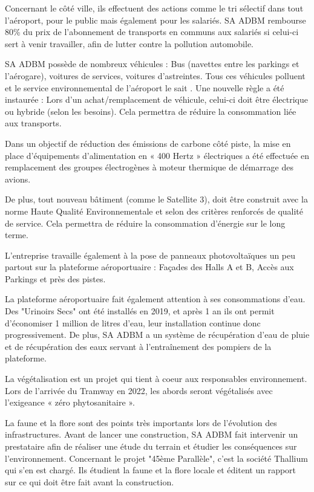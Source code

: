 Concernant le côté ville, ils effectuent des actions comme le tri sélectif dans tout l'aéroport, pour le public mais également pour les salariés. SA ADBM rembourse 80\% du prix de l'abonnement de transports en communs aux salariés si celui-ci sert à venir travailler, afin de lutter contre la pollution automobile.


SA ADBM possède de nombreux véhicules : Bus (navettes entre les parkings et l'aérogare), voitures de services, voitures d'astreintes. Tous ces véhicules polluent et le service environnemental de l'aéroport le sait . Une nouvelle règle a été instaurée : Lors d'un achat/remplacement de véhicule, celui-ci doit être électrique ou hybride (selon les besoins). Cela permettra de réduire la consommation liée aux transports.\newline


Dans un objectif de réduction des émissions de carbone côté piste, la mise en place d’équipements d’alimentation en « 400 Hertz » électriques a été effectuée en remplacement des groupes électrogènes à moteur thermique de démarrage des avions.


De plus, tout nouveau bâtiment (comme le Satellite 3), doit être construit avec la norme Haute Qualité Environnementale et selon des critères renforcés de qualité de service. Cela permettra de réduire la consommation d'énergie sur le long terme.\newline


L'entreprise travaille également à la pose de panneaux photovoltaïques un peu partout sur la plateforme aéroportuaire : Façades des Halls A et B, Accès aux Parkings et près des pistes.


La plateforme aéroportuaire fait également attention à ses consommations d'eau. Des "Urinoirs Secs" ont été installés en 2019, et après 1 an ils ont permit d'économiser 1 million de litres d'eau, leur installation continue donc progressivement.
De plus, SA ADBM a un système de récupération d'eau de pluie et de récupération des eaux servant à l'entraînement des pompiers de la plateforme.\newline


La végétalisation est un projet qui tient à coeur aux responsables environnement. Lors de l'arrivée du Tramway en 2022, les abords seront végétalisés avec l'exigeance « zéro phytosanitaire ».\newline


La faune et la flore sont des points très importants lors de l'évolution des infrastructures. Avant de lancer une construction, SA ADBM fait intervenir un prestataire afin de réaliser une étude du terrain et étudier les conséquences sur l'environnement.
Concernant le projet "45ème Parallèle", c'est la société Thallium qui s'en est chargé. Ils étudient la faune et la flore locale et éditent un rapport sur ce qui doit être fait avant la construction.

